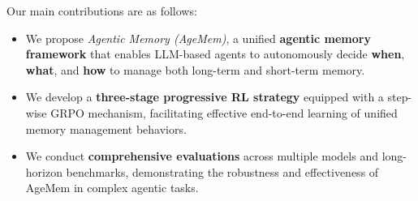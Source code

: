 Our main contributions are as follows:
\begin{itemize}[leftmargin=*, topsep=0pt, itemsep=0pt, parsep=0pt]
\item We propose \textit{Agentic Memory (AgeMem)}, a unified \textbf{agentic memory framework} that enables LLM-based agents to autonomously decide \textbf{when}, \textbf{what}, and \textbf{how} to manage both long-term and short-term memory.
\item We develop a \textbf{three-stage progressive RL strategy} equipped with a step-wise GRPO mechanism, facilitating effective end-to-end learning of unified memory management behaviors.
\item We conduct \textbf{comprehensive evaluations} across multiple models and long-horizon benchmarks, demonstrating the robustness and effectiveness of AgeMem in complex agentic tasks.
\end{itemize}


